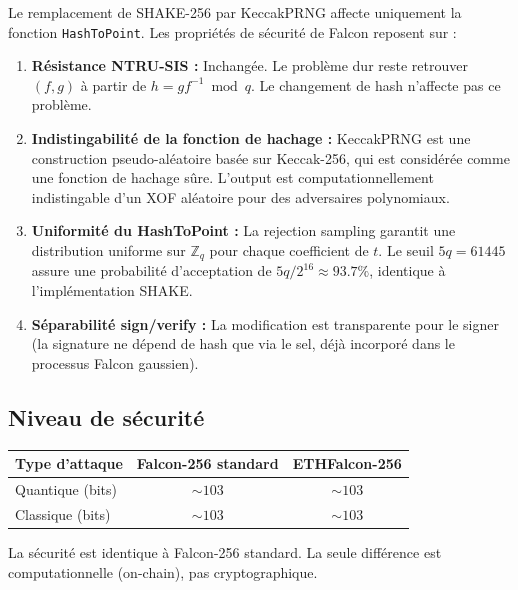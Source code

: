 \documentclass[11pt,a4paper]{article}
\newcommand{\Zq}{\mathbb{Z}_{q}}
\begin{document}
Le remplacement de SHAKE-256 par KeccakPRNG affecte uniquement la fonction
\texttt{HashToPoint}. Les propriétés de sécurité de Falcon reposent sur :

\begin{enumerate}
  \item \textbf{Résistance NTRU-SIS :} Inchangée. Le problème dur reste
        retrouver $(f,g)$ à partir de $h = gf^{-1} \bmod q$. Le changement
        de hash n'affecte pas ce problème.

  \item \textbf{Indistingabilité de la fonction de hachage :} KeccakPRNG est
        une construction pseudo-aléatoire basée sur Keccak-256, qui est
        considérée comme une fonction de hachage sûre. L'output est
        computationnellement indistingable d'un XOF aléatoire pour des
        adversaires polynomiaux.

  \item \textbf{Uniformité du HashToPoint :} La rejection sampling garantit
        une distribution uniforme sur $\Zq$ pour chaque coefficient de $t$.
        Le seuil $5q = 61445$ assure une probabilité d'acceptation de
        $5q/2^{16} \approx 93.7\%$, identique à l'implémentation SHAKE.

  \item \textbf{Séparabilité sign/verify :} La modification est transparente
        pour le signer (la signature ne dépend de hash que via le sel, déjà
        incorporé dans le processus Falcon gaussien).
\end{enumerate}

\subsection{Niveau de sécurité}

\begin{center}
\begin{tabular}{lcc}
\toprule
Type d'attaque & Falcon-256 standard & ETHFalcon-256 \\
\midrule
Quantique (bits) & $\sim 103$ & $\sim 103$ \\
Classique (bits) & $\sim 103$ & $\sim 103$ \\
\bottomrule
\end{tabular}
\end{center}

La sécurité est identique à Falcon-256 standard. La seule différence est
computationnelle (on-chain), pas cryptographique.

\end{document}
